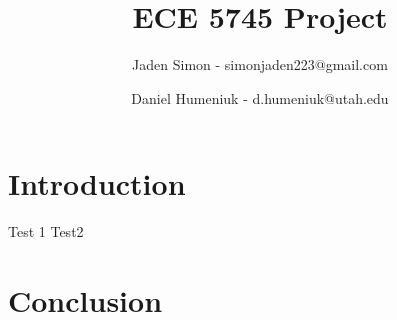 \documentclass[11pt]{report}
\title{ECE 5745 Project}
\author{Jaden Simon - simonjaden223@gmail.com \\ \and
	   Daniel Humeniuk - d.humeniuk@utah.edu}
\begin{document}
\maketitle

\begin{abstract}

\end{abstract}

\section{Introduction}

Test 1 \cite{Sun} Test2 \cite{Kalla}

\section{Conclusion}




\end{document}

